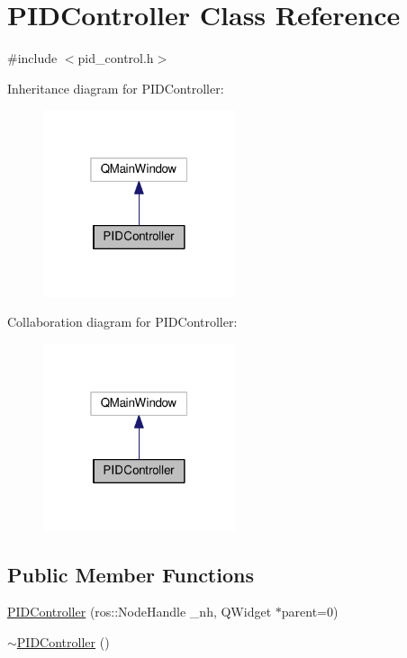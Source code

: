 \hypertarget{classPIDController}{}\section{P\+I\+D\+Controller Class Reference}
\label{classPIDController}


{\ttfamily \#include $<$pid\+\_\+control.\+h$>$}



Inheritance diagram for P\+I\+D\+Controller\+:
\nopagebreak
\begin{figure}[H]
\begin{center}
\leavevmode
\includegraphics[width=160pt]{classPIDController__inherit__graph}
\end{center}
\end{figure}


Collaboration diagram for P\+I\+D\+Controller\+:
\nopagebreak
\begin{figure}[H]
\begin{center}
\leavevmode
\includegraphics[width=160pt]{classPIDController__coll__graph}
\end{center}
\end{figure}
\subsection*{Public Member Functions}
\begin{DoxyCompactItemize}
\item 
\hyperlink{classPIDController_a940e36980116e998daa85ddd4dc42af6}{P\+I\+D\+Controller} (ros\+::\+Node\+Handle \+\_\+nh, Q\+Widget $\ast$parent=0)
\item 
\hyperlink{classPIDController_a690e7ad4796e5c5143aa4b90f2f6677b}{$\sim$\+P\+I\+D\+Controller} ()
\end{DoxyCompactItemize}

